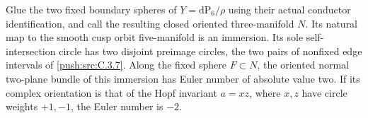 \begin{proposition}\label{push:src:C.3.11}
Glue the two fixed boundary spheres of \(Y=\mathrm{dP}_6/\rho\)
using their actual conductor identification, and call the resulting
closed oriented three-manifold \(N\). Its natural map to the
smooth cusp orbit five-manifold is an immersion. Its sole
self-intersection circle has two disjoint preimage circles, the
two pairs of nonfixed edge intervals of \ref{push:src:C.3.7}.
Along the fixed sphere \(F\subset N\), the oriented normal
two-plane bundle of this immersion has Euler number of absolute
value two. If its complex orientation is that of the Hopf invariant
\(a=xz\), where \(x,z\) have circle weights \(+1,-1\), the
Euler number is \(-2\).
\end{proposition}


